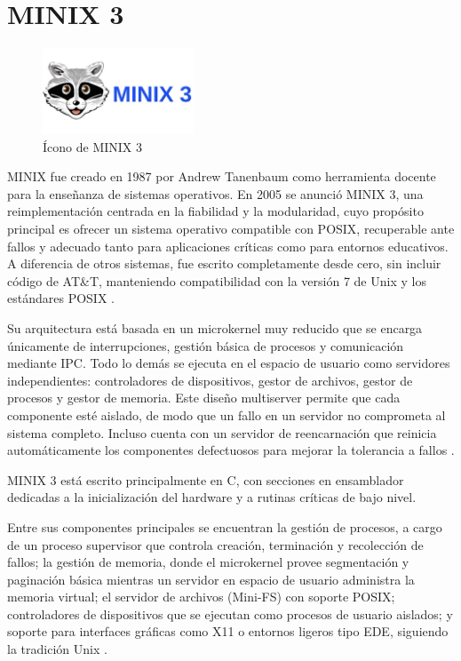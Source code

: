 \section{MINIX 3}

\begin{figure}[H]
    \centering
    \includegraphics[width=0.4\textwidth]{figures/minix.jpeg}
    \caption[Ícono de MINIX 3]%
            {Ícono de MINIX 3 \citep{usenix2010}}
    \label{fig:minix}
\end{figure}

MINIX fue creado en 1987 por Andrew Tanenbaum como herramienta docente para la enseñanza de sistemas operativos. En 2005 se anunció MINIX 3, una reimplementación centrada en la fiabilidad y la modularidad, cuyo propósito principal es ofrecer un sistema operativo compatible con POSIX, recuperable ante fallos y adecuado tanto para aplicaciones críticas como para entornos educativos. A diferencia de otros sistemas, fue escrito completamente desde cero, sin incluir código de AT\&T, manteniendo compatibilidad con la versión 7 de Unix y los estándares POSIX \citep[pp.~10]{usenix2010}.  

Su arquitectura está basada en un microkernel muy reducido que se encarga únicamente de interrupciones, gestión básica de procesos y comunicación mediante IPC. Todo lo demás se ejecuta en el espacio de usuario como servidores independientes: controladores de dispositivos, gestor de archivos, gestor de procesos y gestor de memoria. Este diseño multiserver permite que cada componente esté aislado, de modo que un fallo en un servidor no comprometa al sistema completo. Incluso cuenta con un servidor de reencarnación que reinicia automáticamente los componentes defectuosos para mejorar la tolerancia a fallos \citep{csvu2007}.  

MINIX 3 está escrito principalmente en C, con secciones en ensamblador dedicadas a la inicialización del hardware y a rutinas críticas de bajo nivel.  

Entre sus componentes principales se encuentran la gestión de procesos, a cargo de un proceso supervisor que controla creación, terminación y recolección de fallos; la gestión de memoria, donde el microkernel provee segmentación y paginación básica mientras un servidor en espacio de usuario administra la memoria virtual; el servidor de archivos (Mini-FS) con soporte POSIX; controladores de dispositivos que se ejecutan como procesos de usuario aislados; y soporte para interfaces gráficas como X11 o entornos ligeros tipo EDE, siguiendo la tradición Unix \citep[pp.~12]{usenix2010}.  

